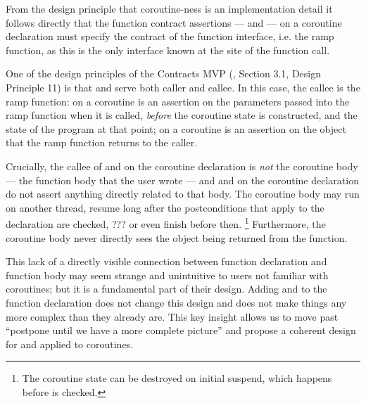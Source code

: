From the design principle that coroutine-ness is an implementation detail it follows directly that the function contract assertions ---  and  --- on a coroutine declaration must specify the contract of the function interface, i.e. the ramp function, as this is the only interface known at the site of the function call.

One of the design principles of the Contracts MVP (\cite{P2900R8}, Section 3.1, Design Principle 11) is that  and  serve both caller and callee. In this case, the callee is the ramp function:  on a coroutine is an assertion on the parameters passed into the ramp function when it is called, \emph{before} the coroutine state is constructed, and the state of the program at that point;  on a coroutine is an assertion on the object that the ramp function returns to the caller.

Crucially, the callee of  and  on the coroutine declaration is \emph{not} the coroutine body --- the function body that the user wrote --- and  and  on the coroutine declaration do not assert anything directly related to that body. The coroutine body may run on another thread, resume long after the postconditions that apply to the declaration are checked, ??? or even finish before then. \footnote{The coroutine state can be destroyed on initial suspend, which happens before  is checked.} Furthermore, the coroutine body never directly sees the object being returned from the function.

This lack of a directly visible connection between function declaration and function body may seem strange and unintuitive to users not familiar with coroutines; but it is a fundamental part of their design. Adding  and  to the function declaration does not change this design and does not make things any more complex than they already are. This key insight allows us to move past ``postpone until we have a more complete picture'' and propose a coherent design for  and  applied to coroutines.

